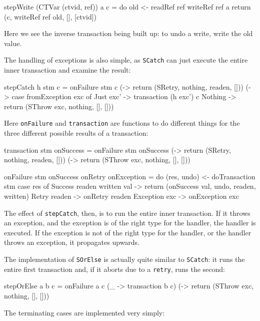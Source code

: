 \begin{haskellcode}
stepWrite (CTVar (ctvid, ref)) a c = do
  old <- readRef ref
  writeRef ref a
  return (c, writeRef ref old, [], [ctvid])
\end{haskellcode}

Here we see the inverse transaction being built up: to undo a write,
write the old value.

The handling of exceptions is also simple, as \verb|SCatch| can just
execute the entire inner transaction and examine the result:

\begin{haskellcode}
stepCatch h stm c = onFailure stm c
  (\readen -> return (SRetry, nothing, readen, []))
  (\exc    -> case fromException exc of
    Just exc' -> transaction (h exc') c
    Nothing   -> return (SThrow exc, nothing, [], []))
\end{haskellcode}

Here \verb|onFailure| and \verb|transaction| are functions to do
different things for the three different possible results of a
transaction:

\begin{haskellcode}
transaction stm onSuccess = onFailure stm onSuccess
  (\readen -> return (SRetry, nothing, readen, []))
  (\exc    -> return (SThrow exc, nothing, [], []))

onFailure stm onSuccess onRetry onException = do
  (res, undo) <- doTransaction stm
  case res of
    Success readen written val -> return (onSuccess val, undo, readen, written)
    Retry readen  -> onRetry readen
    Exception exc -> onException exc
\end{haskellcode}

The effect of \verb|stepCatch|, then, is to run the entire inner
transaction. If it throws an exception, and the exception is of the
right type for the handler, the handler is executed. If the exception
is not of the right type for the handler, or the handler throws an
exception, it propagates upwards.

The implementation of \verb|SOrElse| is actually quite similar to
\verb|SCatch|: it runs the entire first transaction and, if it aborts
due to a \verb|retry|, runs the second:

\begin{haskellcode}
stepOrElse a b c = onFailure a c
  (\_   -> transaction b c)
  (\exc -> return (SThrow exc, nothing, [], []))
\end{haskellcode}

The terminating cases are implemented very simply:

